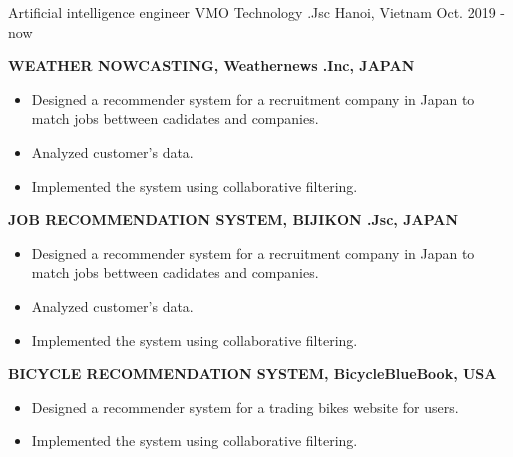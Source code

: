 

\begin{cventries}

  \cventry
    {Artificial intelligence engineer} %
    {VMO Technology .Jsc} %
    {Hanoi, Vietnam} %
    {Oct. 2019 - now} %
    {
      \begin{cvitems} %
        \item {\textbf{WEATHER NOWCASTING, Weathernews .Inc, JAPAN}
                \begin{itemize}
                  \item Designed a recommender system for a recruitment company in Japan to match jobs bettween cadidates and companies.
                  \item Analyzed customer's data.
                  \item Implemented the system using collaborative filtering.
                \end{itemize}}
        \item {\textbf{JOB RECOMMENDATION SYSTEM, BIJIKON .Jsc, JAPAN}
                \begin{itemize}
                  \item Designed a recommender system for a recruitment company in Japan to match jobs bettween cadidates and companies.
                  \item Analyzed customer's data.
                  \item Implemented the system using collaborative filtering.
                \end{itemize}}
        \item {\textbf{BICYCLE RECOMMENDATION SYSTEM, BicycleBlueBook, USA}
                \begin{itemize}
                  \item Designed a recommender system for a trading bikes website for users.
                  \item Implemented the system using collaborative filtering.
                \end{itemize}}

\end{cvitems}}
\end{cventries}

